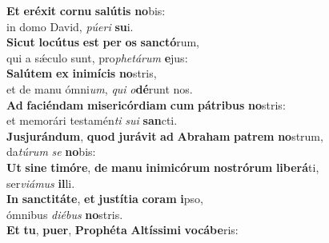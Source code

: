 \evenverse \textbf{Et} \textbf{e}\textbf{ré}\textbf{xit} \textbf{cor}\textbf{nu} \textbf{sa}\textbf{lú}\textbf{tis} \textbf{no}bis:~\*\\
\evenverse in domo David, \textit{pú}\textit{e}\textit{ri} \textbf{su}i.\\
\oddverse \textbf{Si}\textbf{cut} \textbf{lo}\textbf{cú}\textbf{tus} \textbf{est} \textbf{per} \textbf{os} \textbf{san}\textbf{ctó}rum,~\*\\
\oddverse qui a sǽculo sunt, pro\textit{phe}\textit{tá}\textit{rum} \textbf{e}jus:\\
\evenverse \textbf{Sa}\textbf{lú}\textbf{tem} \textbf{ex} \textbf{i}\textbf{ni}\textbf{mí}\textbf{cis} \textbf{no}stris,~\*\\
\evenverse et de manu ómni\textit{um}, \textit{qui} \textit{o}\textbf{dé}runt nos.\\
\oddverse \textbf{Ad} \textbf{fa}\textbf{ci}\textbf{én}\textbf{dam} \textbf{mi}\textbf{se}\textbf{ri}\textbf{cór}\textbf{di}\textbf{am} \textbf{cum} \textbf{pá}\textbf{tri}\textbf{bus} \textbf{no}stris:~\*\\
\oddverse et memorári testamén\textit{ti} \textit{su}\textit{i} \textbf{san}cti.\\
\evenverse \textbf{Jus}\textbf{ju}\textbf{rán}\textbf{dum}, \textbf{quod} \textbf{ju}\textbf{rá}\textbf{vit} \textbf{ad} \textbf{A}\textbf{bra}\textbf{ham} \textbf{pa}\textbf{trem} \textbf{no}strum,~\*\\
\evenverse da\textit{tú}\textit{rum} \textit{se} \textbf{no}bis:\\
\oddverse \textbf{Ut} \textbf{si}\textbf{ne} \textbf{ti}\textbf{mó}\textbf{re}, \textbf{de} \textbf{ma}\textbf{nu} \textbf{i}\textbf{ni}\textbf{mi}\textbf{có}\textbf{rum} \textbf{no}\textbf{stró}\textbf{rum} \textbf{li}\textbf{be}\textbf{rá}ti,~\*\\
\oddverse ser\textit{vi}\textit{á}\textit{mus} \textbf{il}li.\\
\evenverse \textbf{In} \textbf{san}\textbf{cti}\textbf{tá}\textbf{te}, \textbf{et} \textbf{ju}\textbf{stí}\textbf{ti}\textbf{a} \textbf{co}\textbf{ram} \textbf{i}pso,~\*\\
\evenverse ómnibus \textit{di}\textit{é}\textit{bus} \textbf{no}stris.\\
\oddverse \textbf{Et} \textbf{tu}, \textbf{pu}\textbf{er}, \textbf{Pro}\textbf{phé}\textbf{ta} \textbf{Al}\textbf{tís}\textbf{si}\textbf{mi} \textbf{vo}\textbf{cá}\textbf{be}ris:~\*\\
